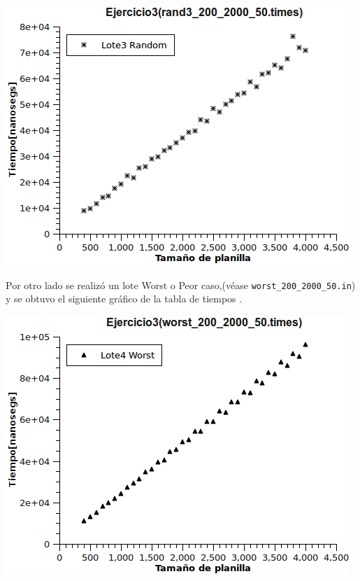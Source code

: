 \includegraphics[scale=0.8]{img/ej3/Graph3.png}
\newline


Por otro lado se realizó un lote Worst o Peor caso,(véase \texttt{worst\_200\_2000\_50.in}) y se obtuvo el siguiente gráfico de la tabla de tiempos .

\includegraphics[scale=0.8]{img/ej3/Graph4.png}

